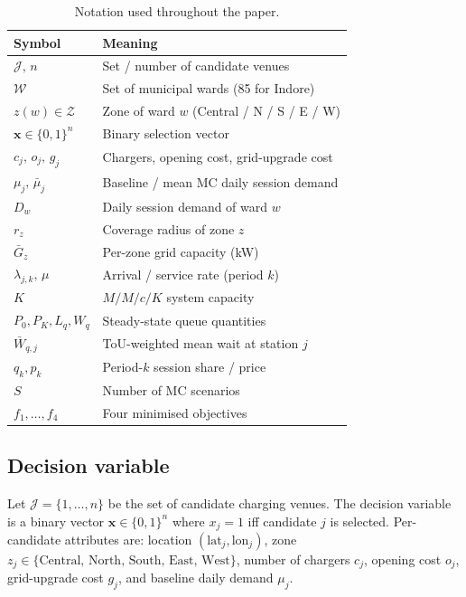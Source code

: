 \documentclass[conference]{IEEEtran}
\begin{document}
\begin{table}[t]
  \centering
  \caption{Notation used throughout the paper.}
  \label{tab:notation}
  \footnotesize
  \begin{tabular}{ll}
    \toprule
    Symbol & Meaning \\
    \midrule
    $\mathcal{J},\,n$        & Set / number of candidate venues \\
    $\mathcal{W}$            & Set of municipal wards (85 for Indore) \\
    $z(w)\!\in\!\mathcal{Z}$ & Zone of ward $w$ (Central / N / S / E / W) \\
    $\mathbf{x}\!\in\!\{0,1\}^{n}$ & Binary selection vector \\
    $c_{j},\,o_{j},\,g_{j}$  & Chargers, opening cost, grid-upgrade cost \\
    $\mu_{j},\,\bar\mu_{j}$  & Baseline / mean MC daily session demand \\
    $D_{w}$                  & Daily session demand of ward $w$ \\
    $r_{z}$                  & Coverage radius of zone $z$ \\
    $\bar G_{z}$             & Per-zone grid capacity (kW) \\
    $\lambda_{j,k},\,\mu$    & Arrival / service rate (period $k$) \\
    $K$                      & $M/M/c/K$ system capacity \\
    $P_{0},P_{K},L_{q},W_{q}$ & Steady-state queue quantities \\
    $\bar W_{q,j}$           & ToU-weighted mean wait at station $j$ \\
    $q_{k},p_{k}$            & Period-$k$ session share / price \\
    $S$                      & Number of MC scenarios \\
    $f_{1},\dots,f_{4}$      & Four minimised objectives \\
    \bottomrule
  \end{tabular}
\end{table}

\subsection{Decision variable}
Let $\mathcal{J}=\{1,\dots,n\}$ be the set of candidate charging venues.
The decision variable is a binary vector
$\mathbf{x}\in\{0,1\}^{n}$ where $x_{j}=1$ iff candidate $j$ is selected.
Per-candidate attributes are: location $(\text{lat}_j,\text{lon}_j)$, zone
$z_{j}\!\in\!\{\text{Central, North, South, East, West}\}$, number of
chargers $c_{j}$, opening cost $o_{j}$, grid-upgrade cost $g_{j}$, and
baseline daily demand $\mu_{j}$.
\end{document}
